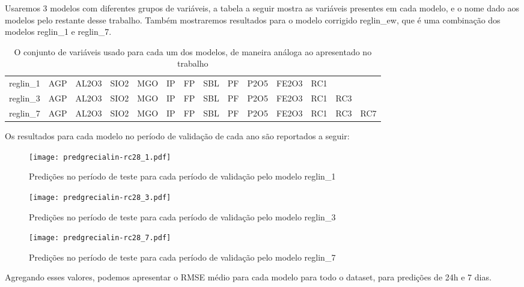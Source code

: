 Usaremos 3 modelos com diferentes grupos de variáveis, a tabela a seguir mostra
as variáveis presentes em cada modelo, e o nome dado aos modelos pelo restante
desse trabalho. Também mostraremos resultados para o modelo corrigido
reglin\_ew, que é uma combinação dos modelos reglin\_1 e reglin\_7.


\begin{table}[]
\centering 
\begin{tabular}{llllllllllllll}
\toprule
reglin\_1 &  AGP &  AL2O3 &  SIO2 &  MGO &  IP &  FP &  SBL &  PF &  P2O5 &  FE2O3 &  RC1 &      &      \\
reglin\_3 &  AGP &  AL2O3 &  SIO2 &  MGO &  IP &  FP &  SBL &  PF &  P2O5 &  FE2O3 &  RC1 &  RC3 &      \\
reglin\_7 &  AGP &  AL2O3 &  SIO2 &  MGO &  IP &  FP &  SBL &  PF &  P2O5 &  FE2O3 &  RC1 &  RC3 &  RC7 \\
\bottomrule
\end{tabular}
\caption{O conjunto de variáveis usado para cada um dos modelos, de maneira análoga ao apresentado no trabalho \cite{grecialin}}
\label{tab:modelslin}
\end{table}

Os resultados para cada modelo no período de validação de cada ano são reportados a seguir:

\begin{figure}[H]
  \centering
  \texttt{[image: predgrecialin-rc28\_1.pdf]}
  \caption{Predições no período de teste para cada período de validação pelo
    modelo reglin\_1}
  \label{fig:rc281preds}
\end{figure}

\begin{figure}[H]
  \centering
  \texttt{[image: predgrecialin-rc28\_3.pdf]}
  \caption{Predições no período de teste para cada período de validação pelo
    modelo reglin\_3}
  \label{fig:rc281preds}

\end{figure}
\begin{figure}[H]
  \centering
  \texttt{[image: predgrecialin-rc28\_7.pdf]}
  \caption{Predições no período de teste para cada período de validação pelo
    modelo reglin\_7}
  \label{fig:rc281preds}

\end{figure}

Agregando esses valores, podemos apresentar o RMSE médio para cada modelo para
todo o dataset, para predições de 24h e 7 dias.


